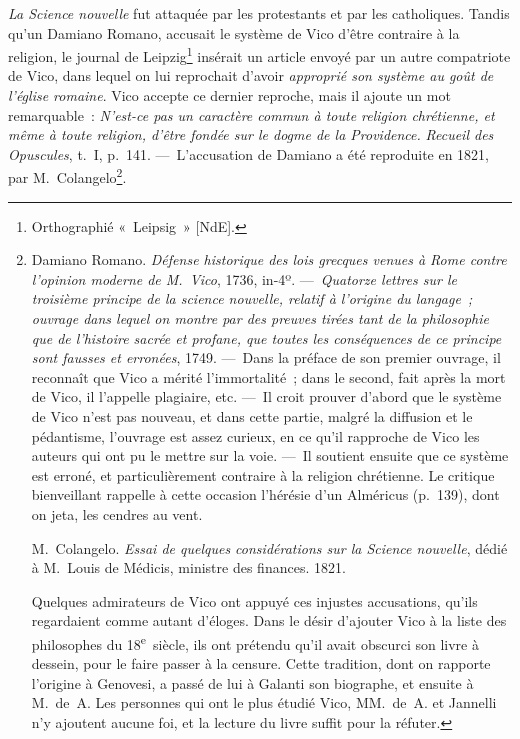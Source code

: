 \documentclass[french,twoside]{book} %
\begin{document}
{\itshape La Science nouvelle} fut attaquée par les protestants et par les catholiques. Tandis qu’un Damiano Romano, accusait le système de Vico d’être contraire à la religion, le journal de Leipzig\footnote{Orthographié « Leipsig » [NdE].} insérait  un article envoyé par un autre compatriote de Vico, dans lequel on lui reprochait d’avoir \emph{{\itshape approprié son système au goût de l’église romaine}}. Vico accepte ce dernier reproche, mais il ajoute un mot remarquable : \emph{{\itshape N’est-ce pas un caractère commun à toute religion chrétienne, et même à toute religion, d’être fondée sur le dogme de la Providence.}} {\itshape Recueil des Opuscules}, t. I, p. 141. — L’accusation de Damiano a été reproduite en 1821, par M. Colangelo\footnote{\noindent Damiano Romano. {\itshape Défense historique des lois grecques venues à Rome contre l’opinion moderne de M. Vico}, 1736, in-4º. — {\itshape Quatorze lettres sur le troisième principe de la science nouvelle, relatif à l’origine du langage ; ouvrage dans lequel on montre par des preuves tirées tant de la philosophie que de l’histoire sacrée et profane, que toutes les conséquences de ce principe sont fausses et erronées}, 1749. — Dans la préface de son premier ouvrage, il reconnaît que Vico a mérité l’immortalité ; dans le second, fait après la mort de Vico, il l’appelle plagiaire, etc. — Il croit prouver d’abord que le système de Vico n’est pas nouveau, et dans cette partie, malgré la diffusion et le pédantisme, l’ouvrage est assez curieux, en ce qu’il rapproche de Vico les auteurs qui ont pu le mettre sur la voie. — Il soutient ensuite que ce système est erroné, et particulièrement contraire à la religion chrétienne. Le critique bienveillant rappelle à cette occasion l’hérésie d’un Alméricus (p. 139), dont on jeta, les cendres au vent.\par
M. Colangelo. {\itshape Essai de quelques considérations sur la Science nouvelle}, dédié à M. Louis de Médicis, ministre des finances. 1821.\par
Quelques admirateurs de Vico ont appuyé ces injustes accusations, qu’ils regardaient comme autant d’éloges. Dans le désir d’ajouter Vico à la liste des philosophes du 18\textsuperscript{e} siècle, ils ont prétendu qu’il avait obscurci son livre à dessein, pour le faire passer à la censure. Cette tradition, dont on rapporte l’origine à Genovesi, a passé de lui à Galanti son biographe, et ensuite à M. de A. Les personnes qui ont le plus étudié Vico, MM. de A. et Jannelli n’y ajoutent aucune foi, et la lecture du livre suffit pour la réfuter.
}.\par
\end{document}
